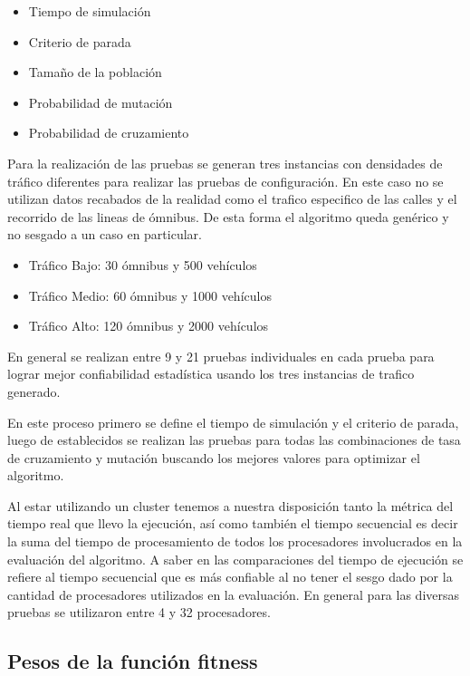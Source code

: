 \begin{itemize}
	\item Tiempo de simulación	
	\item Criterio de parada
	\item Tamaño de la población
	\item Probabilidad de mutación
	\item Probabilidad de cruzamiento
\end{itemize}

Para la realización de las pruebas se generan tres instancias con densidades de tráfico diferentes para realizar las pruebas de configuración. En este caso no se utilizan datos recabados de la realidad como  el trafico especifico de las calles y el recorrido de las lineas de ómnibus. De esta forma el algoritmo queda genérico y no sesgado a un caso en particular.


\begin{itemize}
	\item Tráfico Bajo: 30 ómnibus y 500 vehículos	
	\item Tráfico Medio: 60 ómnibus y 1000 vehículos
	\item Tráfico Alto: 120 ómnibus y 2000 vehículos
\end{itemize}



En general se realizan entre 9 y 21 pruebas individuales en cada prueba para lograr mejor confiabilidad estadística usando los tres instancias de trafico generado.

En este proceso primero se define el tiempo de simulación y el criterio de parada, luego de establecidos se realizan las pruebas para todas las combinaciones de tasa de cruzamiento y mutación buscando los mejores valores para optimizar el algoritmo.

Al estar utilizando un cluster tenemos a nuestra disposición tanto la métrica del tiempo real que llevo la ejecución, así como también el tiempo secuencial es decir la suma del tiempo de procesamiento de todos los procesadores involucrados en la evaluación del algoritmo. 
A saber en las comparaciones del tiempo de ejecución se refiere al tiempo secuencial que es más confiable al no tener el sesgo dado por la cantidad de procesadores utilizados en la evaluación.
En general para las diversas pruebas se utilizaron entre 4 y 32 procesadores.



\subsection{Pesos de la función fitness}

